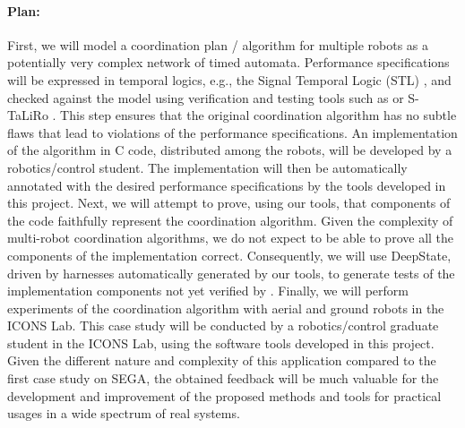 \paragraph{Plan:}

First, we will model a coordination plan / algorithm for multiple robots as a potentially very complex network of timed automata.
Performance specifications will be expressed in temporal logics, e.g., the Signal Temporal Logic (STL) \cite{donze2010robust}, and checked against the model using verification and testing tools such as \uppaal or S-TaLiRo \cite{annpureddy2011s}.
This step ensures that the original coordination algorithm has no subtle flaws that lead to violations of the performance specifications.
An implementation of the algorithm in C code, distributed among the robots, will be developed by a robotics/control student.
The implementation will then be automatically annotated with the desired performance specifications by the tools developed in this project.
Next, we will attempt to prove, using our tools, that components of the code faithfully represent the coordination algorithm.
Given the complexity of multi-robot coordination algorithms, we do not expect \framac to be able to prove all the components of the implementation correct.
Consequently, we will use DeepState, driven by harnesses automatically generated by our tools, to generate tests of the implementation components not yet verified by \framac.
Finally, we will perform experiments of the coordination algorithm with aerial and ground robots in the ICONS Lab.
This case study will be conducted by a robotics/control graduate student in the ICONS Lab, using the software tools developed in this project.
Given the different nature and complexity of this application compared to the first case study on SEGA, the obtained feedback will be much valuable for the development and improvement of the proposed methods and tools for practical usages in a wide spectrum of real systems.


